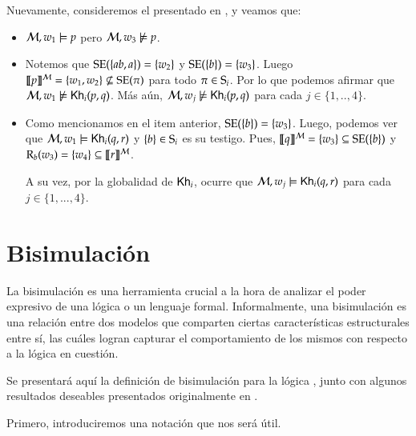 \begin{ejemplo}
    Nuevamente, consideremos el \ults presentado en , y veamos que:
    \begin{itemize}
        \item $\modults,w_1 \models p$ pero $\modults,w_3 \not\models p$.
        \item Notemos que $\sexec(\{ab,a\}) = \{w_2\}$ y $\sexec(\{b\}) = \{w_3\}$. 
        Luego $\truthset{\modults}{p} = \{w_1,w_2\} \not\subseteq \sexec(\pi)$ para todo $\pi \in \S_i$.
        Por lo que podemos afirmar que $\modults,w_1 \not\models \khi(p,q)$.
        Más aún, $\modults,w_j \not\models \khi(p,q)$ para cada $j \in \{1,..,4\}$.
        \item Como mencionamos en el item anterior, $\sexec(\{b\}) = \{w_3\}$. Luego, podemos ver que 
        $\modults, w_1 \models \khi(q,r)$ y $\{b\} \in \S_i$ es su testigo. 
        Pues, $\truthset{\modults}{q} = \{w_3\} \subseteq \sexec(\{b\})$ y $\R_b(w_3) = \{w_4\} \subseteq \truthset{\modults}{r}$.         

        A su vez, por la globalidad de $\khi$, ocurre que $\modults,w_j \models \khi(q,r)$ para cada $j \in \{1,...,4\}$.
    \end{itemize}
\end{ejemplo}


\section{Bisimulación}

La bisimulación es una herramienta crucial a la hora de analizar el poder expresivo de una lógica o un lenguaje formal. 
Informalmente, una bisimulación es una relación entre dos modelos que comparten ciertas características estructurales entre sí, las 
cuáles logran capturar el comportamiento de los mismos con respecto a la lógica en cuestión. 

Se presentará aquí la definición de bisimulación para la lógica \KHilogic, junto con algunos resultados deseables presentados originalmente 
en \cite{ArecesFSV25,SaraviaPHD}.

Primero, introduciremos una notación que nos será útil.

